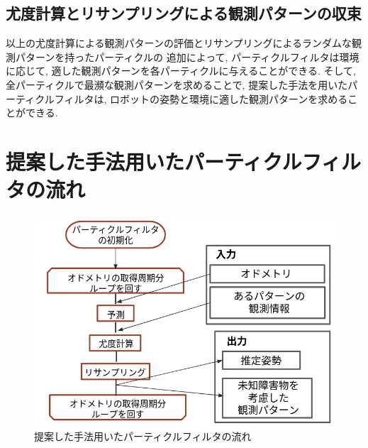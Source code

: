 \subsection{尤度計算とリサンプリングによる観測パターンの収束}

以上の尤度計算による観測パターンの評価とリサンプリングによるランダムな観測パターンを持ったパーティクルの
追加によって, パーティクルフィルタは環境に応じて, 適した観測パターンを各パーティクルに与えることができる. 
そして, 全パーティクルで最瀕な観測パターンを求めることで, 提案した手法を用いたパーティクルフィルタは, 
ロボットの姿勢と環境に適した観測パターンを求めることができる. 

\newpage
\section{提案した手法用いたパーティクルフィルタの流れ}

\begin{figure}[h]
  \begin{center}
    \includegraphics[width=1.0\linewidth]{figs/particle_filter_flow_improve.png}
    \caption{提案した手法用いたパーティクルフィルタの流れ}
    \label{fig:particle_filter_flow_improve}
  \end{center}
\end{figure}
